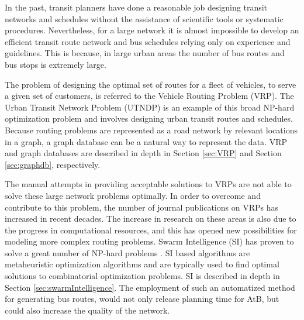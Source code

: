 In the past, transit planners have done a reasonable job designing transit networks and schedules without the assistance of scientific tools or systematic procedures. Nevertheless, for a large network it is almost impossible to develop an efficient transit route network and bus schedules relying only on experience and guidelines. This is because, in large urban areas the number of bus routes and bus stops is extremely large.

The problem of designing the optimal set of routes for a fleet of vehicles, to serve a given set of customers, is referred to the Vehicle Routing Problem (VRP). The Urban Transit Network Problem (UTNDP) is an example of this broad NP-hard optimization problem and involves designing urban transit routes and schedules. Because routing problems are represented as a road network by relevant locations in a graph, a graph database can be a natural way to represent the data. VRP and graph databases are described in depth in Section \vref{sec:VRP} and Section \vref{sec:graphdb}, respectively. 

The manual attempts in providing acceptable solutions to VRPs are not able to solve these large network problems optimally. In order to overcome and contribute to this problem, the number of journal publications on VRPs has increased in recent decades. The increase in research on these areas is also due to the progress in computational resources, and this has opened new possibilities for modeling more complex routing problems. Swarm Intelligence (SI) has proven to solve a great number of NP-hard problems \citep{dorigo97, lucic03}. SI based algorithms are metaheuristic optimization algorithms and are typically used to find optimal solutions to combinatorial optimization problems. SI is described in depth in Section \vref{sec:swarmIntelligence}. The employment of such an automatized method  for generating bus routes, would not only release planning time for AtB, but could also increase the quality of the network.


